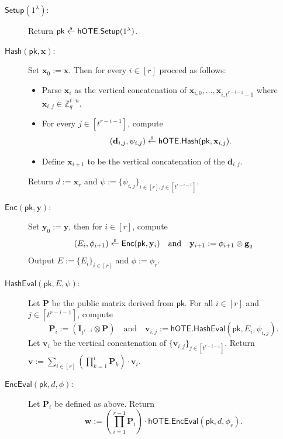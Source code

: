 \documentclass{theoretics}
\newcommand{\getsr}{\overset{\raisebox{-1pt}{$\scriptscriptstyle \$$}}{\gets}}
\newcommand{\sample}{\getsr}
\newcommand{\BOTE}{\mathsf{hOTE}}
\newcommand{\Z}{\mathbb{Z}}
\renewcommand{\sec}{\ensuremath{\lambda}}
\newcommand{\secpar}{\sec}
\newcommand{\algofont}[1]{\ensuremath{\mathsf{#1}}}
\newcommand{\Enc}{{\algofont{Enc}}}
\newcommand{\Setup}{{\algofont{Setup}}}
\newcommand{\Eval}{\algofont{Eval}\xspace}
\newcommand{\Hash}{{\algofont{Hash}}}
\newcommand{\id}{\ensuremath{\mathbf{I}}}
\newcommand{\pk}{{\mathsf{pk}}}
\newcommand\bbbone{1}
\newenvironment{protocol}[1][]
{\begin{algorithm}\caption{#1}}
  {\end{algorithm}}
\begin{document}
\begin{protocol}[Fully Succinct NI-OTE]\label{prot:SOTE}

\begin{description}
\item[$\Setup(1^\secpar)$:] Return $\pk\sample\BOTE.\Setup(\bbbone^\sec)$.

\item[$\Hash(\pk, \mathbf{x})$:] Set $\mathbf{x}_0 := \mathbf{x}$. Then for every $i\in[r]$ proceed as follows:
\begin{itemize}
    \item Parse $\mathbf{x}_i$ as the vertical concatenation of $\mathbf{x}_{i,0},\dots, \mathbf{x}_{i,t^{r-i-1}-1}$ where $\mathbf{x}_{i,j}\in\Z_q^{t\cdot n}$.
    \item For every $j\in[t^{r-i-1}]$, compute 
    \[
    (\mathbf{d}_{i,j}, \psi_{i,j})\sample \BOTE.\Hash(\pk, \mathbf{x}_{i,j}).
    \]
    \item Define $\mathbf{x}_{i+1}$ to be the vertical concatenation of the $\mathbf{d}_{i,j}$.
\end{itemize}
Return $d:=\mathbf{x}_r$ and $\psi:=\{\psi_{i,j}\}_{i\in[r], j\in[t^{r-i-1}]}$.


\item[$\Enc(\pk, \mathbf{y})$:] Set $\mathbf{y}_0 := \mathbf{y}$, then for $i \in [r]$, compute
\[
(E_i, \phi_{i+1})\sample\Enc(\pk, \mathbf{y}_i) \quad\text{and}\quad \mathbf{y}_{i+1}:= \phi_{i+1}\otimes \mathbf{g}_q
\]
Output $E:=\{E_i\}_{i\in[r]}$ and $\phi:=\phi_r$. 

\item[$\Hash\Eval(\pk, E, \psi)$:] Let $\mathbf{P}$ be the public matrix derived from $\pk$. For all $i\in[r]$ and $j\in [t^{r-i-1}]$, compute
\[
\mathbf{P}_i:= (\id_{t^{r-i}}\otimes \mathbf{P})\quad\text{and}\quad
\mathbf{v}_{i,j}:= \BOTE.\Hash\Eval(\pk, E_i, \psi_{i,j}).
\]
Let $\mathbf{v}_i$ be the vertical concatenation of $\{\mathbf{v}_{i,j}\}_{j\in[t^{r-i-1}]}$. Return 
$\mathbf{v}:=\sum_{i\in[r]} \left(\prod_{k=1}^{i} \mathbf{P}_k\right)\cdot \mathbf{v}_i$.

\item[$\Enc\Eval(\pk, d, \phi)$:] Let $\mathbf{P}_i$ be defined as above. Return  
\[\mathbf{w}:=  \left(\prod_{i=1}^{r-1}\mathbf{P}_{i}\right)\cdot \BOTE.\Enc\Eval(\pk, d, \phi_r).\]
\end{description}
\end{protocol}
\end{document}

